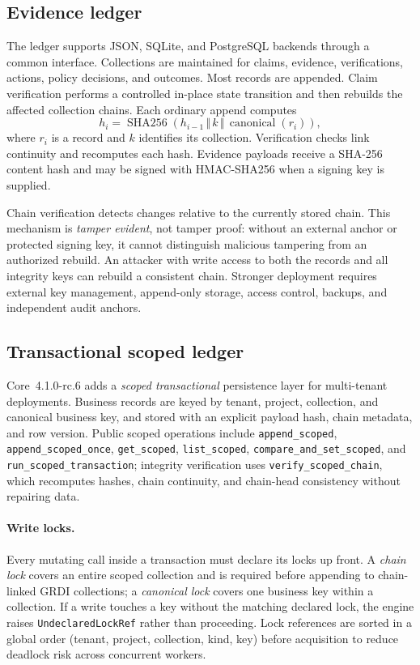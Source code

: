 \documentclass[11pt]{article}
\begin{document}
\subsection{Evidence ledger}

The ledger supports JSON, SQLite, and PostgreSQL backends through a common
interface. Collections are maintained for claims, evidence, verifications,
actions, policy decisions, and outcomes. Most records are appended. Claim
verification performs a controlled in-place state transition and then rebuilds
the affected collection chains. Each ordinary append computes
\[
h_i =
\operatorname{SHA256}\!\left(h_{i-1}\,\Vert\,k\,\Vert\,
\operatorname{canonical}(r_i)\right),
\]
where $r_i$ is a record and $k$ identifies its collection. Verification checks
link continuity and recomputes each hash. Evidence payloads receive a SHA-256
content hash and may be signed with HMAC-SHA256 when a signing key is supplied.

Chain verification detects changes relative to the currently stored chain.
This mechanism is \emph{tamper evident}, not tamper proof: without an external
anchor or protected signing key, it cannot distinguish malicious tampering
from an authorized rebuild. An attacker with write access to both the records
and all integrity keys can rebuild a consistent chain. Stronger deployment
requires external key management, append-only storage, access control, backups,
and independent audit anchors.

\subsection{Transactional scoped ledger}
\label{sec:transactional-ledger}

Core~4.1.0-rc.6 adds a \emph{scoped transactional} persistence layer for
multi-tenant deployments. Business records are keyed by tenant, project,
collection, and canonical business key, and stored with an explicit payload
hash, chain metadata, and row version. Public scoped operations include
\texttt{append\_scoped}, \texttt{append\_scoped\_once}, \texttt{get\_scoped},
\texttt{list\_scoped}, \texttt{compare\_and\_set\_scoped}, and
\texttt{run\_scoped\_transaction}; integrity verification uses
\texttt{verify\_scoped\_chain}, which recomputes hashes, chain continuity, and
chain-head consistency without repairing data.

\paragraph{Write locks.} Every mutating call inside a transaction must declare
its locks up front. A \emph{chain lock} covers an entire scoped collection and
is required before appending to chain-linked GRDI collections; a
\emph{canonical lock} covers one business key within a collection. If a write
touches a key without the matching declared lock, the engine raises
\texttt{UndeclaredLockRef} rather than proceeding. Lock references are sorted
in a global order (tenant, project, collection, kind, key) before acquisition
to reduce deadlock risk across concurrent workers.
\end{document}
